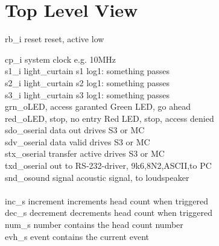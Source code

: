 \documentclass[12pt,a4 paper] {report}
\begin{document}
\chapter{Top Level View}
\begin{flushleft}
	rb\_i \hspace{1cm} reset \hfill reset, active low
\end{flushleft} 
cp\_i \hspace{1cm} system clock \hfill e.g. 10MHz \\
s1\_i \hspace{1cm} light\_curtain s1 \hfill log1: something passes \\
s2\_i \hspace{1cm} light\_curtain s2 \hfill log1: something passes \\
s3\_i \hspace{1cm} light\_curtain s3 \hfill log1: something passes \\
grn\_o\hspace{0.9cm}LED, access garanted \hfill Green LED, go ahead \\
red\_o\hspace{0.9cm}LED, stop, no entry \hfill Red LED, stop, access denied \\
sdo\_o\hspace{0.9cm}serial data out \hfill drives S3 or MC\\
sdv\_o\hspace{0.9cm}serial data valid \hfill drives S3 or MC\\
stx\_o\hspace{1cm}serial transfer active \hfill drives S3 or MC\\
txd\_o\hspace{1cm}serial out \hfill to RS-232-driver, 9k6,8N2,ASCII,to PC\\
snd\_o\hspace{0.9cm}sound signal \hfill acoustic signal, to loudspeaker\\
\\
inc\_s \hspace{0.9cm} increment \hfill increments head count when triggered\\
dec\_s \hspace{0.8cm} decrement \hfill decrements head count when triggered\\
num\_s \hspace{0.6cm} number \hfill contains the head count number\\
evh\_s \hspace{0.8cm} event \hfill contains the current event\\
\end{document}
